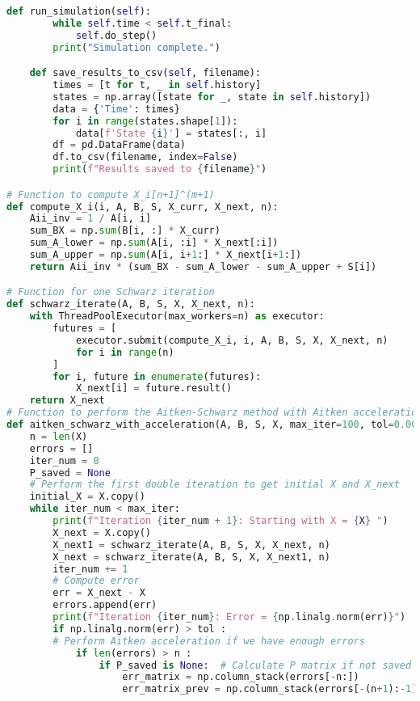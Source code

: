 \begin{lstlisting}[style=vscode, language=python, label={tab:A7},caption={méta-modèle d'une plateforme de co-simulation}]
    def run_simulation(self):
        while self.time < self.t_final:
            self.do_step()
        print("Simulation complete.")

    def save_results_to_csv(self, filename):
        times = [t for t, _ in self.history]
        states = np.array([state for _, state in self.history])
        data = {'Time': times}
        for i in range(states.shape[1]):
            data[f'State {i}'] = states[:, i]
        df = pd.DataFrame(data)
        df.to_csv(filename, index=False)
        print(f"Results saved to {filename}")

# Function to compute X_i[n+1]^(m+1)
def compute_X_i(i, A, B, S, X_curr, X_next, n):
    Aii_inv = 1 / A[i, i]
    sum_BX = np.sum(B[i, :] * X_curr)
    sum_A_lower = np.sum(A[i, :i] * X_next[:i])
    sum_A_upper = np.sum(A[i, i+1:] * X_next[i+1:])
    return Aii_inv * (sum_BX - sum_A_lower - sum_A_upper + S[i])

# Function for one Schwarz iteration
def schwarz_iterate(A, B, S, X, X_next, n):
    with ThreadPoolExecutor(max_workers=n) as executor:
        futures = [
            executor.submit(compute_X_i, i, A, B, S, X, X_next, n)
            for i in range(n)
        ]
        for i, future in enumerate(futures):
            X_next[i] = future.result()
    return X_next
# Function to perform the Aitken-Schwarz method with Aitken acceleration
def aitken_schwarz_with_acceleration(A, B, S, X, max_iter=100, tol=0.000001):
    n = len(X)
    errors = []
    iter_num = 0
    P_saved = None
    # Perform the first double iteration to get initial X and X_next
    initial_X = X.copy()
    while iter_num < max_iter:
        print(f"Iteration {iter_num + 1}: Starting with X = {X} ")
        X_next = X.copy()
        X_next1 = schwarz_iterate(A, B, S, X, X_next, n)
        X_next = schwarz_iterate(A, B, S, X, X_next1, n)
        iter_num += 1
        # Compute error
        err = X_next - X
        errors.append(err)
        print(f"Iteration {iter_num}: Error = {np.linalg.norm(err)}")
        if np.linalg.norm(err) > tol :
        # Perform Aitken acceleration if we have enough errors
            if len(errors) > n :
                if P_saved is None:  # Calculate P matrix if not saved
                    err_matrix = np.column_stack(errors[-n:])
                    err_matrix_prev = np.column_stack(errors[-(n+1):-1])


\end{lstlisting}
